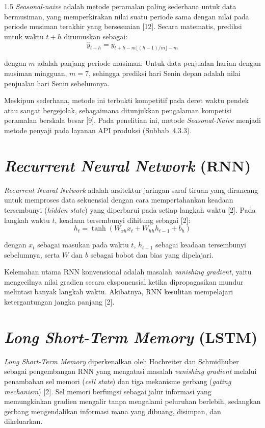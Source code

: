 \documentclass[12pt, a4paper, onecolumn, oneside]{report}
\begin{document}
\begin{spacing}{1.5}
\textit{Seasonal-naive} adalah metode peramalan paling sederhana untuk data bermusiman, yang memperkirakan nilai suatu periode sama dengan nilai pada periode musiman terakhir yang bersesuaian [12]. Secara matematis, prediksi untuk waktu $t+h$ dirumuskan sebagai:
\begin{equation}
    \hat{y}_{t+h} = y_{t+h-m\lfloor (h-1)/m \rfloor - m}
\end{equation}

\noindent dengan $m$ adalah panjang periode musiman. Untuk data penjualan harian dengan musiman mingguan, $m = 7$, sehingga prediksi hari Senin depan adalah nilai penjualan hari Senin sebelumnya.

Meskipun sederhana, metode ini terbukti kompetitif pada deret waktu pendek atau sangat bergejolak, sebagaimana ditunjukkan pengalaman kompetisi peramalan berskala besar [9]. Pada penelitian ini, metode \textit{Seasonal-Naive} menjadi metode penyaji pada layanan API produksi (Subbab~4.3.3).

\section{\textit{Recurrent Neural Network} (RNN)}

\textit{Recurrent Neural Network} adalah arsitektur jaringan saraf tiruan yang dirancang untuk memproses data sekuensial dengan cara mempertahankan keadaan tersembunyi (\textit{hidden state}) yang diperbarui pada setiap langkah waktu [2]. Pada langkah waktu $t$, keadaan tersembunyi dihitung sebagai [2]:
\begin{equation}
    h_t = \tanh(W_{xh} x_t + W_{hh} h_{t-1} + b_h)
\end{equation}

\noindent dengan $x_t$ sebagai masukan pada waktu $t$, $h_{t-1}$ sebagai keadaan tersembunyi sebelumnya, serta $W$ dan $b$ sebagai bobot dan bias yang dipelajari.

Kelemahan utama RNN konvensional adalah masalah \textit{vanishing gradient}, yaitu mengecilnya nilai gradien secara eksponensial ketika dipropagasikan mundur melintasi banyak langkah waktu. Akibatnya, RNN kesulitan mempelajari ketergantungan jangka panjang [2].

\section{\textit{Long Short-Term Memory} (LSTM)}

\textit{Long Short-Term Memory} diperkenalkan oleh Hochreiter dan Schmidhuber sebagai pengembangan RNN yang mengatasi masalah \textit{vanishing gradient} melalui penambahan sel memori (\textit{cell state}) dan tiga mekanisme gerbang (\textit{gating mechanism}) [2]. Sel memori berfungsi sebagai jalur informasi yang memungkinkan gradien mengalir tanpa mengalami peluruhan berlebih, sedangkan gerbang mengendalikan informasi mana yang dibuang, disimpan, dan dikeluarkan.


\end{spacing}
\end{document}
